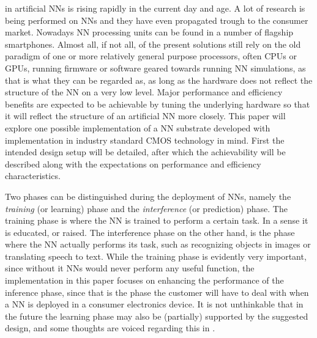  in artificial \acp{NN} is rising rapidly in the current day and age. A lot of research is being performed on \acp{NN} and they have even propagated trough to the consumer market. Nowadays \ac{NN} processing units can be found in a number of flagship smartphones. Almost all, if not all, of the present solutions still rely on the old paradigm of one or more relatively general purpose processors, often \acp{CPU} or \acp{GPU}, running firmware or software geared towards running \ac{NN} simulations, as that is what they can be regarded as, as long as the hardware does not reflect the structure of the \ac{NN} on a very low level. Major performance and efficiency benefits are expected to be achievable by tuning the underlying hardware so that it will reflect the structure of an artificial \ac{NN} more closely. This paper will explore one possible implementation of a \ac{NN} substrate developed with implementation in industry standard CMOS technology in mind. First the intended design setup will be detailed, after which the achievability will be described along with the expectations on performance and efficiency characteristics.

Two phases can be distinguished during the deployment of \acp{NN}, namely the \textit{training} (or learning) phase and the \textit{interference} (or prediction) phase\cite{8192463}. The training phase is where the \ac{NN} is trained to perform a certain task. In a sense it is educated, or raised. The interference phase on the other hand, is the phase where the \ac{NN} actually performs its task, such as recognizing objects in images or translating speech to text. While the training phase is evidently very important, since without it \acp{NN} would never perform any useful function, the implementation in this paper focuses on enhancing the performance of the inference phase, since that is the phase the customer will have to deal with when a \ac{NN} is deployed in a consumer electronics device. It is not unthinkable that in the future the learning phase may also be (partially) supported by the suggested design, and some thoughts are voiced regarding this in .


